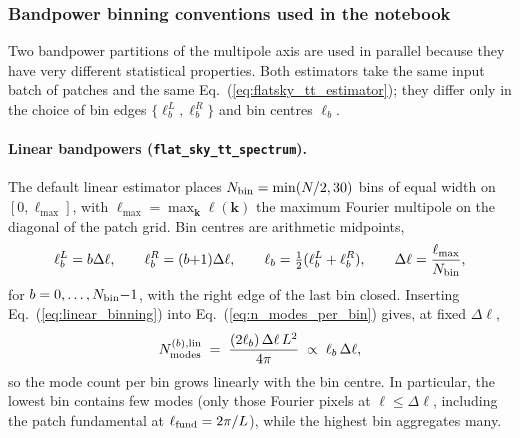 \documentclass[11pt]{article}
\theoremstyle{definition}
\begin{document}
\subsubsection{Bandpower binning conventions used in the notebook}
\label{sec:fm_diag_binning}

Two bandpower partitions of the multipole axis are used in parallel because they have very different statistical properties. Both estimators take the same input batch of patches and the same Eq.~(\ref{eq:flatsky_tt_estimator}); they differ only in the choice of bin edges $\{\ell_b^L,\ell_b^R\}$ and bin centres $\ell_b$.

\paragraph{Linear bandpowers (\texttt{flat\_sky\_tt\_spectrum}).} The default linear estimator places $N_{\rm bin}=\min(N/2,30)$ bins of equal width on $[0,\ell_{\max}]$, with $\ell_{\max}=\max_{\bm k}\ell(\bm k)$ the maximum Fourier multipole on the diagonal of the patch grid. Bin centres are arithmetic midpoints,
\begin{equation}
  \ell_b^L=b\Delta\ell,\qquad
  \ell_b^R=(b{+}1)\Delta\ell,\qquad
  \ell_b=\tfrac12(\ell_b^L+\ell_b^R),\qquad
  \Delta\ell=\frac{\ell_{\max}}{N_{\rm bin}},
  \label{eq:linear_binning}
\end{equation}
for $b=0,\ldots,N_{\rm bin}{-}1$, with the right edge of the last bin closed. Inserting Eq.~(\ref{eq:linear_binning}) into Eq.~(\ref{eq:n_modes_per_bin}) gives, at fixed $\Delta\ell$,
\begin{equation}
  N^{(b),{\rm lin}}_{\rm modes}\;=\;\frac{(2\ell_b)\,\Delta\ell\,L^2}{4\pi}
  \;\propto\;\ell_b\,\Delta\ell,
\end{equation}
so the mode count per bin grows linearly with the bin centre. In particular, the lowest bin contains few modes (only those Fourier pixels at $\ell\!\leq\!\Delta\ell$, including the patch fundamental at $\ell_{\rm fund}=2\pi/L$), while the highest bin aggregates many.
\end{document}
